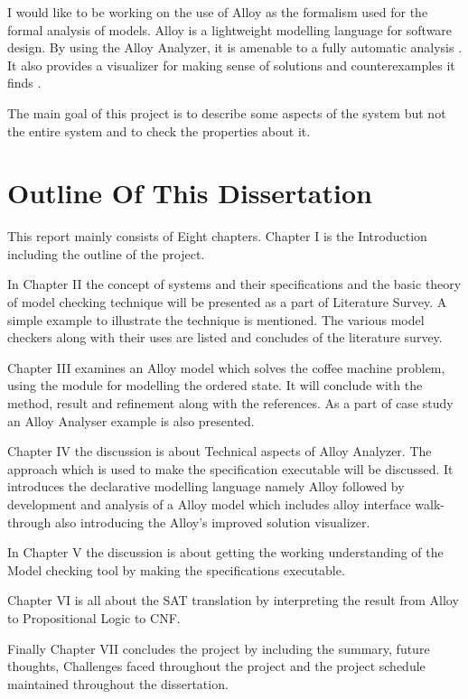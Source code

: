 \documentclass[a4paper,12pt]{report}
\begin{document}
I would like to be working on the use of Alloy as the formalism used for the formal analysis of models. Alloy is a lightweight modelling language for software design. By using the Alloy Analyzer, it is amenable to a fully automatic analysis \cite{J.M.Wing1996}. It also provides a visualizer for making sense of solutions and counterexamples it finds \cite{A.Blandford2000}.

The main goal of this project is to describe some aspects of the system but not the entire system and to check the properties about it. 
 
\section{Outline Of This Dissertation}
\label{Outline dissert}

This report mainly consists of Eight chapters. Chapter I is the Introduction including the outline of the project.

In Chapter II the concept of systems and their specifications and the basic theory of model checking technique will be presented as a part of Literature Survey. A simple example to illustrate the technique is mentioned. The various model checkers along with their uses are listed and concludes of the literature survey.

Chapter III examines an Alloy model which solves the coffee machine problem, using the module for modelling the ordered state. It will conclude with the method, result and refinement along with the references. As a part of case study an Alloy Analyser example is also presented.

Chapter IV the discussion is about Technical aspects of Alloy Analyzer. The approach which is used to make the specification executable will be discussed. It introduces the declarative modelling language namely Alloy followed by development and analysis of a Alloy model which includes alloy interface walk-through also introducing the Alloy's improved solution visualizer. 

In Chapter V the discussion is about getting the working understanding of the Model checking tool by making the specifications executable.

Chapter VI is all about the SAT translation by interpreting the result from Alloy to Propositional Logic to CNF. 

Finally Chapter VII concludes the project by including the summary, future thoughts, Challenges faced throughout the project and the project schedule maintained throughout the dissertation.
\end{document}
